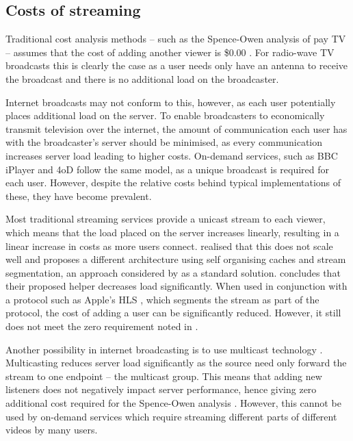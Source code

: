 \subsection{Costs of streaming}

	Traditional cost analysis methods -- such as the Spence-Owen analysis of pay TV -- assumes that the cost of adding another viewer is \$0.00 \citep{broadcastEconomics}. For radio-wave TV broadcasts this is clearly the case as a user needs only have an antenna to receive the broadcast and there is no additional load on the broadcaster. 

	Internet broadcasts may not conform to this, however, as each user potentially places additional load on the server. To enable broadcasters to economically transmit television over the internet, the amount of communication each user has with the broadcaster's server should be minimised, as every communication increases server load leading to higher costs. On-demand services, such as BBC iPlayer and 4oD follow the same model, as a unique broadcast is required for each user. However, despite the relative costs behind typical implementations of these, they have become prevalent.

	Most traditional streaming services provide a unicast stream to each viewer, which means that the load placed on the server increases linearly, resulting in a linear increase in costs as more users connect. \citet{cachedStream} realised that this does not scale well and proposes a different architecture using self organising caches and stream segmentation, an approach considered by \citet{segmentProxyCaching} as a standard solution. \citet{cachedStream} concludes that their proposed helper decreases load significantly. When used in conjunction with a protocol such as Apple's HLS \cite{HLS}, which segments the stream as part of the protocol, the cost of adding a user can be significantly reduced. However, it still does not meet the zero requirement noted in \citet{broadcastEconomics}.

	Another possibility in internet broadcasting is to use multicast technology \citep{multicast}. Multicasting reduces server load significantly as the source need only forward the stream to one endpoint -- the multicast group. This means that adding new listeners does not negatively impact server performance, hence giving zero additional cost required for the Spence-Owen analysis \citep{broadcastEconomics}. However, this cannot be used by on-demand services which require streaming different parts of different videos by many users.
